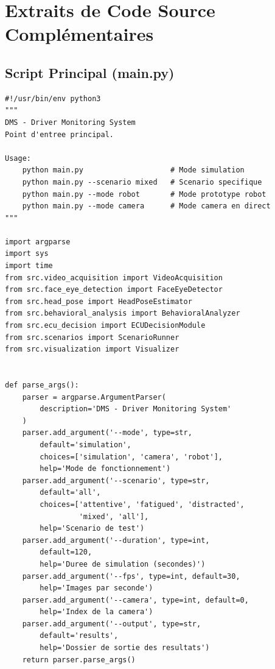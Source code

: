 
\chapter{Extraits de Code Source Complémentaires}

\section{Script Principal (main.py)}

\begin{lstlisting}[style=pythonstyle, caption={Point d'entrée principal du système DMS.}, label={lst:main}]
#!/usr/bin/env python3
"""
DMS - Driver Monitoring System
Point d'entree principal.

Usage:
    python main.py                    # Mode simulation
    python main.py --scenario mixed   # Scenario specifique
    python main.py --mode robot       # Mode prototype robot
    python main.py --mode camera      # Mode camera en direct
"""

import argparse
import sys
import time
from src.video_acquisition import VideoAcquisition
from src.face_eye_detection import FaceEyeDetector
from src.head_pose import HeadPoseEstimator
from src.behavioral_analysis import BehavioralAnalyzer
from src.ecu_decision import ECUDecisionModule
from src.scenarios import ScenarioRunner
from src.visualization import Visualizer


def parse_args():
    parser = argparse.ArgumentParser(
        description='DMS - Driver Monitoring System'
    )
    parser.add_argument('--mode', type=str, 
        default='simulation',
        choices=['simulation', 'camera', 'robot'],
        help='Mode de fonctionnement')
    parser.add_argument('--scenario', type=str,
        default='all',
        choices=['attentive', 'fatigued', 'distracted', 
                 'mixed', 'all'],
        help='Scenario de test')
    parser.add_argument('--duration', type=int, 
        default=120,
        help='Duree de simulation (secondes)')
    parser.add_argument('--fps', type=int, default=30,
        help='Images par seconde')
    parser.add_argument('--camera', type=int, default=0,
        help='Index de la camera')
    parser.add_argument('--output', type=str, 
        default='results',
        help='Dossier de sortie des resultats')
    return parser.parse_args()



\end{lstlisting}
